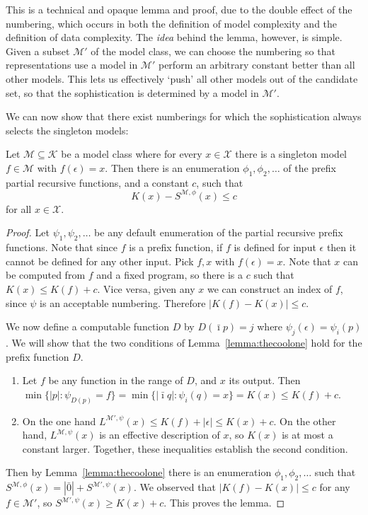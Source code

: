 \documentclass{style/llncs}
\newcommand{\M}{\mathscr M}
\newcommand{\K}{\mathscr K}
\newcommand{\X}{\mathscr X}
\begin{document}
This is a technical and opaque lemma and proof, due to the double effect of the numbering, which occurs in both the definition of model complexity and the definition of data complexity. The \emph{idea} behind the lemma, however, is simple. Given a subset $\M'$ of the model class, we can choose the numbering so that representations use a model in $\M'$ perform an arbitrary constant better than all other models. This lets us effectively `push' all other models out of the candidate set, so that the sophistication is determined by a model in $\M'$.

We can now show that there exist numberings for which the sophistication always selects the singleton models:

\begin{lemma}[overfitting]
Let $\M \subseteq \K$ be a model class where for every $x\in\X$ there is a singleton model $f\in\M$ with $f(\epsilon)=x$. Then there is an enumeration $\phi_1,\phi_2,\ldots$ of the prefix partial recursive functions, and a constant $c$, such that
\[
K(x)-S^{\M,\phi}(x)\le c
\]
for all $x\in\X$.
\end{lemma}
\begin{proof}
Let $\psi_1,\psi_2,\ldots$ be any default enumeration of the partial recursive prefix functions. Note that since $f$ is a prefix function, if $f$ is defined for input $\epsilon$ then it cannot be defined for any other input. Pick $f,x$ with $f(\epsilon)=x$. Note that $x$ can be computed from $f$ and a fixed program, so there is a $c$ such that $K(x)\le K(f)+c$. Vice versa, given any $x$ we can construct an index of $f$, since $\psi$ is an acceptable numbering. Therefore $|K(f)-K(x)|\le c$.

We now define a computable function $D$ by $D(\bar\imath p)=j$ where $\psi_j(\epsilon) = \psi_i(p)$.  We will show that the two conditions of Lemma~\ref{lemma:thecoolone} hold for the prefix function $D$.

\begin{enumerate}
\item Let $f$ be any function in the range of $D$, and $x$ its output. Then $\min\{|p|:\psi_{D(p)}=f\}=\min\{|\bar\imath q|:\psi_i(q)=x\}=K(x)\le K(f)+c$.
\item On the one hand $L^{\M',\psi}(x)\le K(f)+|\epsilon|\le K(x)+c$. On the other hand, $L^{\M,\psi}(x)$ is an effective description of $x$, so $K(x)$ is at most a constant larger.
Together, these inequalities establish the second condition.
\end{enumerate}

Then by Lemma~\ref{lemma:thecoolone} there is an enumeration $\phi_1,\phi_2,\ldots$ such that $S^{\M,\phi}(x)=|\bar 0|+S^{\M',\psi}(x)$. We observed that $|K(f)-K(x)|\le c$ for any $f\in\M'$, so $S^{\M',\psi}(x)\ge K(x)+c$. This proves the lemma.
\end{proof}
\end{document}
